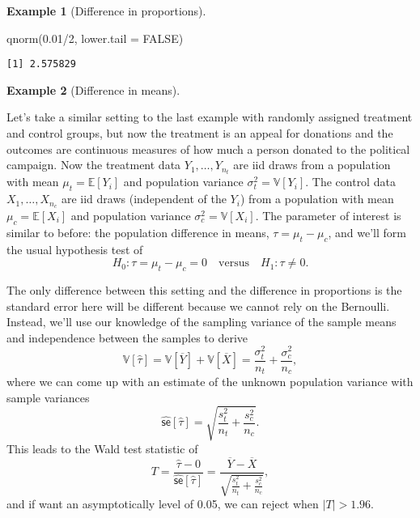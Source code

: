 \documentclass[
  letterpaper,
  DIV=11,
  numbers=noendperiod]{scrreprt}
\newenvironment{Shaded}{\begin{snugshade}}{\end{snugshade}}
\newcommand{\AttributeTok}[1]{\textcolor[rgb]{0.40,0.45,0.13}{#1}}
\newcommand{\ConstantTok}[1]{\textcolor[rgb]{0.56,0.35,0.01}{#1}}
\newcommand{\DecValTok}[1]{\textcolor[rgb]{0.68,0.00,0.00}{#1}}
\newcommand{\FloatTok}[1]{\textcolor[rgb]{0.68,0.00,0.00}{#1}}
\newcommand{\FunctionTok}[1]{\textcolor[rgb]{0.28,0.35,0.67}{#1}}
\newcommand{\NormalTok}[1]{\textcolor[rgb]{0.00,0.23,0.31}{#1}}
\newcommand{\SpecialCharTok}[1]{\textcolor[rgb]{0.37,0.37,0.37}{#1}}
\newcommand{\E}{\mathbb{E}}
\newcommand{\V}{\mathbb{V}}
\newcommand{\se}{\textsf{se}}
\newcommand{\Xbar}{\overline{X}}
\newcommand{\Ybar}{\overline{Y}}
\theoremstyle{definition}
\theoremstyle{plain}
\theoremstyle{definition}
\newtheorem{example}{Example}[chapter]
\theoremstyle{remark}
\begin{document}
\begin{example}[Difference in proportions]
\begin{Shaded}
\begin{Highlighting}[]
\FunctionTok{qnorm}\NormalTok{(}\FloatTok{0.01}\SpecialCharTok{/}\DecValTok{2}\NormalTok{, }\AttributeTok{lower.tail =} \ConstantTok{FALSE}\NormalTok{)}
\end{Highlighting}
\end{Shaded}

\begin{verbatim}
[1] 2.575829
\end{verbatim}

\end{example}

\leavevmode{}%
\begin{example}[Difference in means]\label{exm-diff-in-means}

Let's take a similar setting to the last example with randomly assigned
treatment and control groups, but now the treatment is an appeal for
donations and the outcomes are continuous measures of how much a person
donated to the political campaign. Now the treatment data
\(Y_1, \ldots, Y_{n_t}\) are iid draws from a population with mean
\(\mu_t = \E[Y_i]\) and population variance \(\sigma^2_t = \V[Y_i]\).
The control data \(X_1, \ldots, X_{n_c}\) are iid draws (independent of
the \(Y_i\)) from a population with mean \(\mu_c = \E[X_i]\) and
population variance \(\sigma^2_c = \V[X_i]\). The parameter of interest
is similar to before: the population difference in means,
\(\tau = \mu_t - \mu_c\), and we'll form the usual hypothesis test of
\[ 
H_0: \tau = \mu_t - \mu_c = 0 \quad\text{versus}\quad H_1: \tau \neq 0.
\]

The only difference between this setting and the difference in
proportions is the standard error here will be different because we
cannot rely on the Bernoulli. Instead, we'll use our knowledge of the
sampling variance of the sample means and independence between the
samples to derive \[  
\V[\widehat{\tau}] = \V[\Ybar] + \V[\Xbar] = \frac{\sigma^2_t}{n_t} + \frac{\sigma^2_c}{n_c},
\] where we can come up with an estimate of the unknown population
variance with sample variances \[  
\widehat{\se}[\widehat{\tau}] = \sqrt{\frac{s^2_t}{n_t} + \frac{s^2_c}{n_c}}.
\] This leads to the Wald test statistic of \[ 
T = \frac{\widehat{\tau} - 0}{\widehat{\se}[\widehat{\tau}]} = \frac{\Ybar - \Xbar}{\sqrt{\frac{s^2_t}{n_t} + \frac{s^2_c}{n_c}}},
\] and if want an asymptotically level of 0.05, we can reject when
\(|T| > 1.96\).

\end{example}
\end{document}
